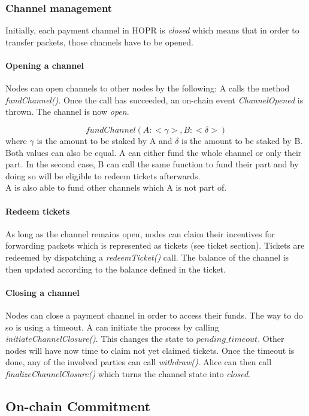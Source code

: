 \subsubsection{Channel management}
Initially, each payment channel in HOPR is \textit{closed} which means that in order to transfer packets, those channels have to be opened. 
\paragraph{Opening a channel} Nodes can open channels to other nodes by the following:
A calls the method \textit{fundChannel()}. Once the call has succeeded, an on-chain event \textit{ChannelOpened} is thrown. The channel is now \textit{open}.

$$fundChannel(A: <\gamma>, B: <\delta>)$$ where $\gamma$ is the amount to be staked by A and $\delta$ is the amount to be staked by B. Both values can also be equal. 
A can either fund the whole channel or only their part. In the second case, B can call the same function to fund their part and by doing so will be eligible to redeem tickets afterwards.
\\A is also able to fund other channels which A is not part of.

\paragraph{Redeem tickets}
As long as the channel remains open, nodes can claim their incentives for forwarding packets which is represented as tickets (see ticket section). Tickets are redeemed by dispatching a \textit{redeemTicket()} call. The balance of the channel is then updated according to the balance defined in the ticket.
\paragraph{Closing a channel}
Nodes can close a payment channel in order to access their funds. The way to do so is using a timeout.
A can initiate the process by calling \textit{initiateChannelClosure()}. This changes the state to $pending\_timeout$. Other nodes will have now time to claim not yet claimed tickets. Once the timeout is done, any of the involved parties can call \textit{withdraw()}. Alice can then call \textit{finalizeChannelClosure()} which turns the channel state into \textit{closed}. 



\subsection{On-chain Commitment}

